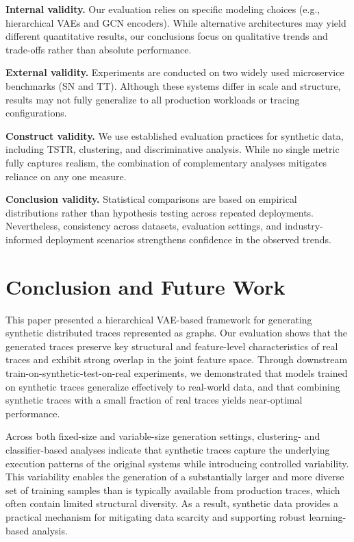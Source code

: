 \documentclass[sigconf,review]{acmart}
\begin{document}
\textbf{Internal validity.}
Our evaluation relies on specific modeling choices (e.g., hierarchical VAEs and GCN encoders). While alternative architectures may yield different quantitative results, our conclusions focus on qualitative trends and trade-offs rather than absolute performance.

\textbf{External validity.}
Experiments are conducted on two widely used microservice benchmarks (SN and TT). Although these systems differ in scale and structure, results may not fully generalize to all production workloads or tracing configurations.

\textbf{Construct validity.}
We use established evaluation practices for synthetic data, including TSTR, clustering, and discriminative analysis. While no single metric fully captures realism, the combination of complementary analyses mitigates reliance on any one measure.

\textbf{Conclusion validity.}
Statistical comparisons are based on empirical distributions rather than hypothesis testing across repeated deployments. Nevertheless, consistency across datasets, evaluation settings, and industry-informed deployment scenarios strengthens confidence in the observed trends.


\section{Conclusion and Future Work}
\label{sec:conclusion}

This paper presented a hierarchical VAE-based framework for generating synthetic distributed traces represented as graphs. Our evaluation shows that the generated traces preserve key structural and feature-level characteristics of real traces and exhibit strong overlap in the joint feature space. Through downstream train-on-synthetic-test-on-real experiments, we demonstrated that models trained on synthetic traces generalize effectively to real-world data, and that combining synthetic traces with a small fraction of real traces yields near-optimal performance.

Across both fixed-size and variable-size generation settings, clustering- and classifier-based analyses indicate that synthetic traces capture the underlying execution patterns of the original systems while introducing controlled variability. This variability enables the generation of a substantially larger and more diverse set of training samples than is typically available from production traces, which often contain limited structural diversity. As a result, synthetic data provides a practical mechanism for mitigating data scarcity and supporting robust learning-based analysis.
\end{document}
